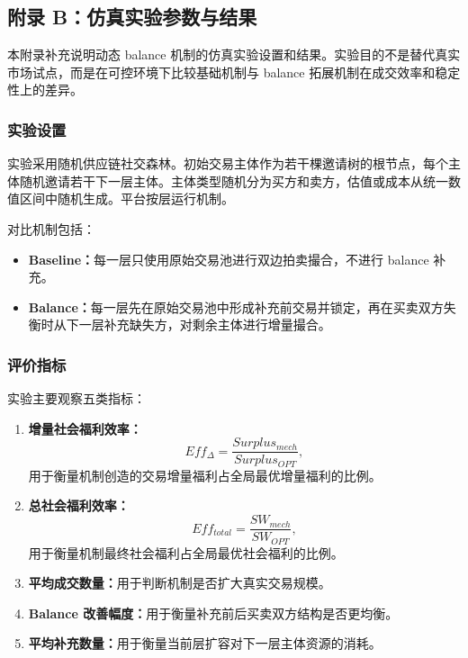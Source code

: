 \documentclass[UTF8,a4paper,12pt]{ctexart}
\begin{document}
\subsection{附录 B：仿真实验参数与结果}

本附录补充说明动态 balance 机制的仿真实验设置和结果。实验目的不是替代真实市场试点，而是在可控环境下比较基础机制与 balance 拓展机制在成交效率和稳定性上的差异。

\subsubsection{实验设置}

实验采用随机供应链社交森林。初始交易主体作为若干棵邀请树的根节点，每个主体随机邀请若干下一层主体。主体类型随机分为买方和卖方，估值或成本从统一数值区间中随机生成。平台按层运行机制。

对比机制包括：

\begin{itemize}
    \item \textbf{Baseline：}每一层只使用原始交易池进行双边拍卖撮合，不进行 balance 补充。
    \item \textbf{Balance：}每一层先在原始交易池中形成补充前交易并锁定，再在买卖双方失衡时从下一层补充缺失方，对剩余主体进行增量撮合。
\end{itemize}

\subsubsection{评价指标}

实验主要观察五类指标：

\begin{enumerate}
    \item \textbf{增量社会福利效率：}
          \[
              Eff_{\Delta}=
              \frac{Surplus_{mech}}{Surplus_{OPT}},
          \]
          用于衡量机制创造的交易增量福利占全局最优增量福利的比例。
    \item \textbf{总社会福利效率：}
          \[
              Eff_{total}=
              \frac{SW_{mech}}{SW_{OPT}},
          \]
          用于衡量机制最终社会福利占全局最优社会福利的比例。
    \item \textbf{平均成交数量：}用于判断机制是否扩大真实交易规模。
    \item \textbf{Balance 改善幅度：}用于衡量补充前后买卖双方结构是否更均衡。
    \item \textbf{平均补充数量：}用于衡量当前层扩容对下一层主体资源的消耗。
\end{enumerate}
\end{document}
